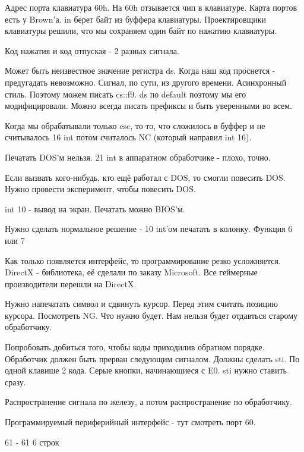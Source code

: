 Адрес порта клавиатура 60h. На 60h отзывается чип в клавиатуре. Карта портов есть у Brown'а. 
in берет байт из буффера клавиатуры. Проектировщики клавиатуры решили, что мы сохраняем один байт по нажатию клавиатуры. 

Код нажатия и код отпуская - 2 разных сигнала.

Может быть неизвестное значение регистра ds. Когда наш код проснется - предугадать невозможно. Сигнал, по сути, из другого времени. Асинхронный стиль. Поэтому можем писать cs::f9.
ds по default поэтому мы его модифицировали. Можно всегда писать префиксы и быть уверенными во всем. 

Когда мы обрабатывали только esc, то то, что сложилось в буффер и не считывалось 16 int потом считалось NC (который направил int 16). 

Печатать DOS'м нельзя. 21 int в аппаратном обработчике - плохо, точно. 

Если вызвать кого-нибудь, кто ещё работал с DOS, то смогли повесить DOS. Нужно провести эксперимент, чтобы повесить DOS.

int 10 - вывод на экран. Печатать можно BIOS'м. 

\begin{hw}Нужно сделать нормальное решение - 10 int'ом печатать в колонку. Функция 6 или 7\end{hw}

\begin{off}Как только появляется интерфейс, то программирование резко усложняется. DirectX - библиотека, её сделали по заказу Microsoft. Все геймерные производители перешли на DirectX.  
\end{off}

Нужно напечатать символ и сдвинуть курсор. Перед этим считать позицию курсора. Посмотреть NG.
Что нужно будет. Нам нельзя будет отдавться старому обработчику.

Попробовать добиться того, чтобы коды приходилив обратном порядке. Обработчик должен быть прерван следующим сигналом. Должны сделать sti. По одной клавише 2 кода. Серые кнопки, начинающиеся с E0.     
sti нужно ставить сразу. 

Распространение сигнала по железу, а потом распространение по обработчику. 
 
Программируемый периферийный интерфейс - тут смотреть порт 60. 

61 - 61 6 строк 